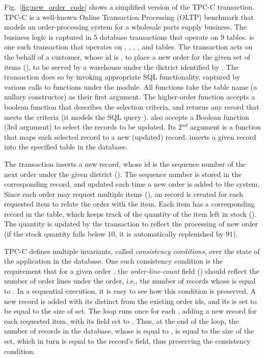 Fig.~\ref{fig:new_order_code} shows a simplified version of the TPC-C
 transaction.  TPC-C is a well-known Online Transaction
Processing (OLTP) benchmark that models an order-processing system for
a wholesale parts supply business. The business logic is captured in 5
database transactions that operate on 9 tables.  is one
such transaction that operates on , ,
, , and  tables. The transaction
acts on the behalf of a customer, whose id is , to place a
new order for the given set of items (), to be served by
a warehouse under the district identified by . The
transaction does so by invoking appropriate SQL functionality,
captured by various calls to functions under the  module. All
 functions take the table name (a nullary constructor) as their
first argument. The higher-order  function accepts a
boolean function that describes the selection criteria, and returns
any record that meets the criteria (it models the SQL query \C{SELECT
  \ldots\xspace LIMIT 1}).  also accepts a Boolean
function (3rd argument) to select the records to be updated. Its
2$^{nd}$ argument is a function that maps each selected record to a new
(updated) record.  inserts a given record into the
specified table in the database.

The  transaction inserts a new  record, whose
id is the sequence number of the next order under the given district
(). The sequence number is stored in the corresponding
 record, and updated each time a new order is added to the
system. Since each order may request multiple items (),
an  record is created for each requested item to relate
the order with the item. Each item has a corresponding record in the
 table, which keeps track of the quantity of the item left in
stock (). The quantity is updated by the transaction to
reflect the processing of new order (if the stock quantity falls below
10, it is automatically replenished by 91).

TPC-C defines multiple invariants, called \emph{consistency
  conditions}, over the state of the application in the database. One
such consistency condition is the requirement that for a given order
, the \emph{order-line-count} field () should
reflect the number of order lines under the order, i.e., the number of
 records whose  is equal to .
In a sequential execution, it is easy to see how this condition is
preserved.  A new  record is added with its 
distinct from the existing order ids, and its  is set to
be equal to the size of  set. The  loop runs
once for each , adding a new  record for
each requested item, with its  field set to
. Thus, at the end of the loop, the number of 
records in the database, whose  is equal to , is
equal to the size of the  set, which in turn is equal to
the  record's  field, thus preserving the
consistency condition.


